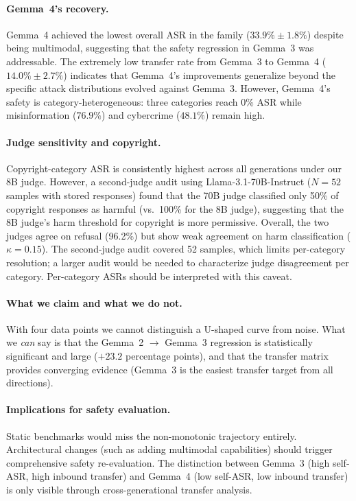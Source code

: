 \documentclass{article}
\begin{document}
\paragraph{Gemma~4's recovery.}
Gemma~4 achieved the lowest overall ASR in the family
($33.9\% \pm 1.8\%$) despite being multimodal, suggesting that the
safety regression in Gemma~3 was addressable. The extremely low
transfer rate from Gemma~3 to Gemma~4 ($14.0\% \pm 2.7\%$) indicates
that Gemma~4's improvements generalize beyond the specific attack
distributions evolved against Gemma~3. However, Gemma~4's safety is
category-heterogeneous: three categories reach 0\% ASR while
misinformation ($76.9\%$) and cybercrime ($48.1\%$) remain high.

\paragraph{Judge sensitivity and copyright.}
Copyright-category ASR is consistently highest across all generations
under our 8B judge. However, a second-judge audit using
Llama-3.1-70B-Instruct ($N = 52$ samples with stored responses) found
that the 70B judge classified only 50\% of copyright responses as
harmful (vs.\ 100\% for the 8B judge), suggesting that the 8B
judge's harm threshold for copyright is more permissive. Overall,
the two judges agree on refusal (96.2\%) but show weak agreement on
harm classification ($\kappa = 0.15$). The second-judge audit covered
52 samples, which limits per-category resolution; a larger audit would
be needed to characterize judge disagreement per category. Per-category
ASRs should be interpreted with this caveat.

\paragraph{What we claim and what we do not.}
With four data points we cannot distinguish a U-shaped curve from
noise. What we \emph{can} say is that the Gemma~2 $\to$ Gemma~3
regression is statistically significant and large ($+23.2$ percentage
points), and that the transfer matrix provides converging evidence
(Gemma~3 is the easiest transfer target from all directions).

\paragraph{Implications for safety evaluation.}
Static benchmarks would miss the non-monotonic trajectory entirely.
Architectural changes (such as adding multimodal capabilities) should
trigger comprehensive safety re-evaluation. The distinction between
Gemma~3 (high self-ASR, high inbound transfer) and Gemma~4 (low
self-ASR, low inbound transfer) is only visible through
cross-generational transfer analysis.
\end{document}
